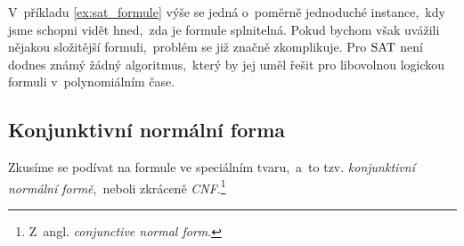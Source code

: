 V~příkladu \ref{ex:sat_formule} výše se jedná o~poměrně jednoduché instance,~kdy jsme schopni vidět hned,~zda je formule splnitelná. Pokud bychom však uvážili nějakou složitější formuli,~problém se již značně zkomplikuje.
Pro \ensuremath{\SAT} není dodnes známý žádný algoritmus,~který by jej uměl řešit pro libovolnou logickou formuli v~polynomiálním čase.

\subsection{Konjunktivní normální forma}\label{subsec:cnf}

Zkusíme se podívat na formule ve speciálním tvaru,~a~to tzv. \emph{konjunktivní normální formě},~neboli zkráceně \emph{CNF}.\footnote{Z~angl. \emph{conjunctive normal form}.}

